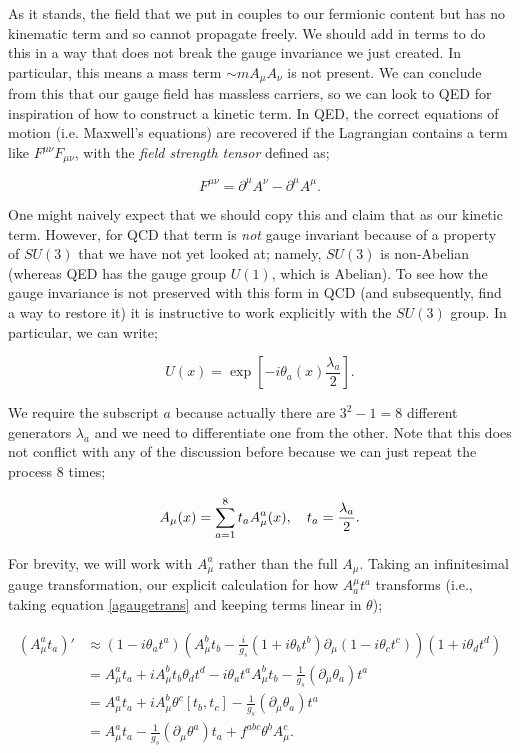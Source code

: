 As it stands, the field that we put in couples to our fermionic content but has no kinematic term and so cannot propagate freely. We should add in terms to do this in a way that does not break the gauge invariance we just created. In particular, this means a mass term $\sim m A_\mu A_\nu$ is not present. We can conclude from this that our gauge field has massless carriers, so we can look to QED for inspiration of how to construct a kinetic term. In QED, the correct equations of motion (i.e. Maxwell's equations) are recovered if the Lagrangian contains a term like $F^{\mu \nu} F_{\mu \nu}$, with the \emph{field strength tensor} defined as;

\begin{equation}
F^{\mu \nu} = \partial ^\mu A^\nu - \partial^\mu A^\mu. 
\end{equation}

One might naively expect that we should copy this and claim that as our kinetic term. However, for QCD that term is \emph{not} gauge invariant because of a property of $SU(3)$ that we have not yet looked at; namely, $SU(3)$ is non-Abelian (whereas QED has the gauge group $U(1)$, which is Abelian). To see how the gauge invariance is not preserved with this form in QCD (and subsequently, find a way to restore it) it is instructive to work explicitly with the $SU(3)$ group. In particular, we can write;

\begin{equation}
U(x) = \exp \left[- i \theta_a (x) \frac{\lambda_a}{2} \right].
\end{equation}

We require the subscript $a$ because actually there are $3^2 - 1 = 8$ different generators $\lambda_a$ and we need to differentiate one from the other. Note that this does not conflict with any of the discussion before because we can just repeat the process 8 times;

\begin{equation}
A_\mu (x) = \sum_{a=1}^8 t_a A_\mu^a(x), \hspace{10 pt} t_a = \frac{\lambda_a}{2}.
\end{equation}

For brevity, we will work with $A_\mu ^a$ rather than the full $A_\mu$. Taking an infinitesimal gauge transformation, our explicit calculation for how $A^\mu_a t^a$ transforms (i.e., taking equation \ref{agaugetrans} and keeping terms linear in $\theta$);

\begin{equation}
\begin{split}
(A_\mu^a t_a)' &\approx (1- i \theta_a t ^a)\left(A_\mu^b t_b - \frac{i}{g_s}(1 + i \theta_b t^b)\partial_\mu (1 - i \theta_c t^c)\right)(1 + i \theta_d t^d) \\
&= A_\mu^a t_a  + i A_\mu ^b t_b \theta_d t^d - i \theta_a t^a A_\mu^b t_b - \frac{1}{g_s} (\partial_\mu \theta_a) t^a \\
&= A_\mu^a t_a + i A_\mu^b \theta^c \left[ t_b, t_c \right] - \frac{1}{g_s} (\partial_\mu \theta_a) t^a \\
&= A_\mu^a t_a -\frac{1}{g_s}(\partial_\mu \theta^a)t_a + f^{abc}  \theta^b A_\mu^c. 
\end{split}
\end{equation} 

